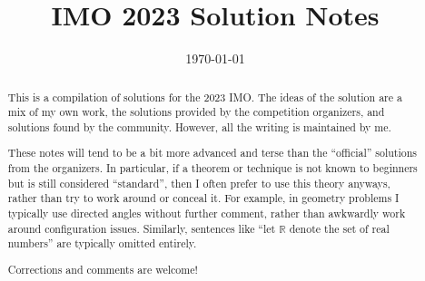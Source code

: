 \documentclass[11pt]{scrartcl}
\title{IMO 2023 Solution Notes}
\date{\today}
\begin{document}
\maketitle

\begin{abstract}
This is a compilation of solutions
for the 2023 IMO.
The ideas of the solution are a mix of my own work,
the solutions provided by the competition organizers,
and solutions found by the community.
However, all the writing is maintained by me.

These notes will tend to be a bit more advanced and terse than the ``official''
solutions from the organizers.
In particular, if a theorem or technique is not known to beginners
but is still considered ``standard'', then I often prefer to
use this theory anyways, rather than try to work around or conceal it.
For example, in geometry problems I typically use directed angles
without further comment, rather than awkwardly work around configuration issues.
Similarly, sentences like ``let $\mathbb{R}$ denote the set of real numbers''
are typically omitted entirely.

Corrections and comments are welcome!
\end{abstract}

\tableofcontents
\newpage

\addtocounter{section}{-1}
\end{document}
